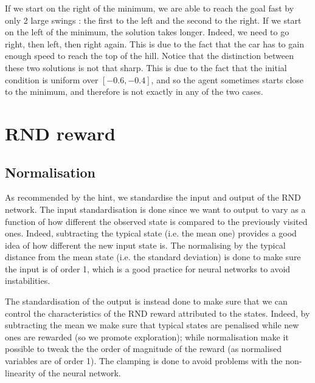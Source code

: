 \documentclass[a4paper, 12pt,oneside]{article}
\begin{document}
        If we start on the right of the minimum, we are able to reach the goal fast by only 2 large swings : the first to the left and the second to the right. If we start on the left of the minimum, the solution takes longer. Indeed, we need to go right, then left, then right again. This is due to the fact that the car has to gain enough speed to reach the top of the hill.
        Notice that the distinction between these two solutions is not that sharp. This is due to the fact that the initial condition is uniform over $[-0.6,-0.4]$, and so the agent sometimes starts close to the minimum, and therefore is not exactly in any of the two cases. 
        \section{RND reward}
            \subsection{Normalisation} 
            As recommended by the hint, we standardise the input and output of the RND network. The input standardisation is done since we want to output to vary as a function of how different the observed state is compared to the previously visited ones. Indeed, subtracting the typical state (i.e. the mean one) provides a good idea of how different the new input state is. The normalising by the typical distance from the mean state (i.e. the standard deviation) is done to make sure the input is of order 1, which is a good practice for neural networks to avoid instabilities.
            
            The standardisation of the output is instead done to make sure that we can control the characteristics of the RND reward attributed to the states. Indeed, by subtracting the mean we make sure that typical states are penalised  while new ones are rewarded (so we promote exploration); while normalisation make it possible to tweak the the order of magnitude of the reward (as normalised variables are of order 1). The clamping is done to avoid problems with the non-linearity of the neural network. 
\end{document}
